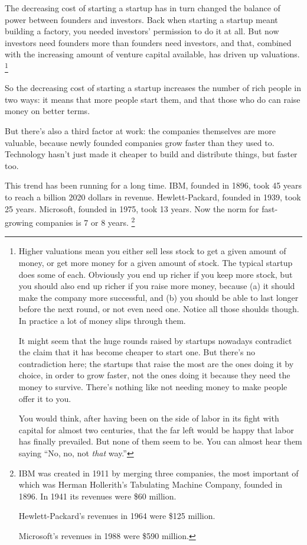 The decreasing cost of starting a startup has in turn changed the
balance of power between founders and investors. Back when starting a
startup meant building a factory, you needed investors' permission to do
it at all. But now investors need founders more than founders need
investors, and that, combined with the increasing amount of venture
capital available, has driven up valuations. \footnote{Higher valuations mean you either sell less stock to get a given
amount of money, or get more money for a given amount of stock. The
typical startup does some of each. Obviously you end up richer if you
keep more stock, but you should also end up richer if you raise more
money, because (a) it should make the company more successful, and (b)
you should be able to last longer before the next round, or not even
need one. Notice all those shoulds though. In practice a lot of money
slips through them.

It might seem that the huge rounds raised by startups nowadays
contradict the claim that it has become cheaper to start one. But
there's no contradiction here; the startups that raise the most are the
ones doing it by choice, in order to grow faster, not the ones doing it
because they need the money to survive. There's nothing like not needing
money to make people offer it to you.

You would think, after having been on the side of labor in its fight
with capital for almost two centuries, that the far left would be happy
that labor has finally prevailed. But none of them seem to be. You can
almost hear them saying ``No, no, not \emph{that} way.''}

So the decreasing cost of starting a startup increases the number of
rich people in two ways: it means that more people start them, and that
those who do can raise money on better terms.

But there's also a third factor at work: the companies themselves are
more valuable, because newly founded companies grow faster than they
used to. Technology hasn't just made it cheaper to build and distribute
things, but faster too.

This trend has been running for a long time. IBM, founded in 1896, took
45 years to reach a billion 2020 dollars in revenue. Hewlett-Packard,
founded in 1939, took 25 years. Microsoft, founded in 1975, took 13
years. Now the norm for fast-growing companies is 7 or 8 years.
\footnote{IBM was created in 1911 by merging three companies, the most
important of which was Herman Hollerith's Tabulating Machine Company,
founded in 1896. In 1941 its revenues were \$60 million.

Hewlett-Packard's revenues in 1964 were \$125 million.

Microsoft's revenues in 1988 were \$590 million.}

